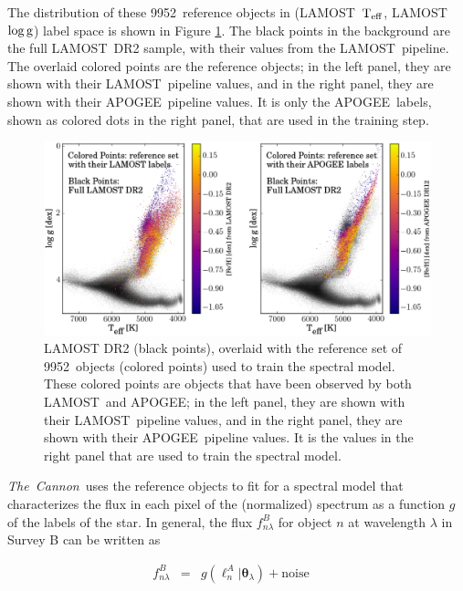 \documentclass[12pt, letterpaper, preprint]{aastex}
\newcommand{\tc}{\textsl{The~Cannon}}
\newcommand{\apogee}{APOGEE}
\newcommand{\lamost}{LAMOST}
\newcommand{\set}[1]{\bm{#1}}
\newcommand{\teff}{\mbox{$\rm T_{eff}$}}
\newcommand{\logg}{\mbox{$\rm \log g$}}
\newcommand{\starlabel}{\ell}
\newcommand{\starlabelvec}{\set{\starlabel}}
\newcommand{\ntrobj}{9952}
\begin{document}
The distribution of these \ntrobj\ reference objects in (\lamost\ \teff, \lamost\ \logg) label space is shown in 
Figure \ref{fig:reference-set-label-space}. The black points in the background are the full
\lamost\ DR2 sample, with their values from the \lamost\ pipeline. 
The overlaid colored points are the reference objects; in the left panel, they are shown with their
\lamost\ pipeline values, and in the right panel, they are shown with their \apogee\ pipeline values.
It is only the \apogee\ labels, shown as colored dots in the right panel,
that are used in the training step. 

\begin{figure}[H]
\centering
\includegraphics[scale=0.6]{f3.eps}
\caption{
LAMOST DR2 (black points), overlaid with the reference set of \ntrobj\ objects (colored points) used to train the spectral model.
These colored points are objects that have been observed by both \lamost\ and \apogee;
in the left panel, they are shown with their
\lamost\ pipeline values, and in the right panel, they are shown with their \apogee\ pipeline values.
It is the values in the right panel that are used to train the spectral model.}
\label{fig:reference-set-label-space}
\end{figure}

\tc\ uses the reference objects to fit for a spectral model that characterizes the flux
in each pixel of the (normalized) spectrum as a function $g$ of the labels of the star. 
In general, the flux $f_{n\lambda}^B$ for object $n$ at wavelength $\lambda$ in Survey B can be written as

\begin{eqnarray}
f_{n\lambda}^B &=&
g(\starlabelvec^A_n |  \set{\theta}_\lambda) + \mbox{noise}
\label{eq:specmodel}\quad 
\end{eqnarray}
\end{document}
